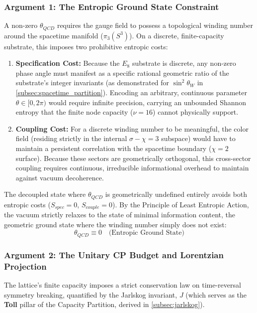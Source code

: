 \subsubsection{Argument 1: The Entropic Ground State Constraint}
A non-zero $\theta_{QCD}$ requires the gauge field to possess a topological winding number around the spacetime manifold ($\pi_3(S^3)$). On a discrete, finite-capacity substrate, this imposes two prohibitive entropic costs:
\begin{enumerate}
    \item \textbf{Specification Cost:} Because the $E_8$ substrate is discrete, any non-zero phase angle must manifest as a specific rational geometric ratio of the substrate's integer invariants (as demonstrated for $\sin^2\theta_W$ in \cref{subsec:spacetime_partition}). Encoding an arbitrary, continuous parameter $\theta \in[0, 2\pi)$ would require infinite precision, carrying an unbounded Shannon entropy that the finite node capacity ($\nu=16$) cannot physically support.
    \item \textbf{Coupling Cost:} For a discrete winding number to be meaningful, the color field (residing strictly in the internal $\sigma-\chi=3$ subspace) would have to maintain a persistent correlation with the spacetime boundary ($\chi=2$ surface). Because these sectors are geometrically orthogonal, this cross-sector coupling requires continuous, irreducible informational overhead to maintain against vacuum decoherence.
\end{enumerate}
The decoupled state where $\theta_{QCD}$ is geometrically undefined entirely avoids both entropic costs ($S_{spec}=0$, $S_{couple}=0$). By the Principle of Least Entropic Action, the vacuum strictly relaxes to the state of minimal information content, the geometric ground state where the winding number simply does not exist:
\begin{equation}
    \theta_{QCD} \equiv 0 \quad \text{(Entropic Ground State)}
\end{equation}

\subsubsection{Argument 2: The Unitary CP Budget and Lorentzian Projection}
The lattice's finite capacity imposes a strict conservation law on time-reversal symmetry breaking, quantified by the Jarlskog invariant, $J$ (which serves as the \textbf{Toll} pillar of the Capacity Partition, derived in \cref{subsec:jarlskog}). 

